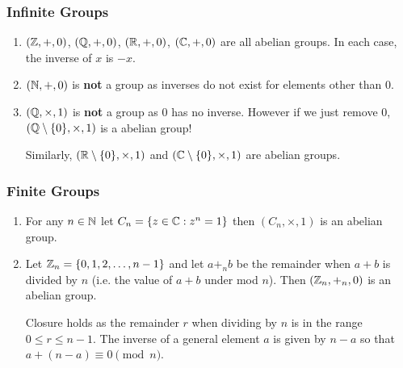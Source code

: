 \documentclass[../main.tex]{subfiles}
\begin{document}
\subsubsection{Infinite Groups}
\begin{enumerate}
  \item $(\mathbb{Z},  +, 0)$, $(\mathbb{Q}, +, 0)$, $(\mathbb{R}, +, 0)$, $(\mathbb{C}, +, 0)$ are all abelian groups.
    In each case, the inverse of $x$ is $-x$.
  \item $(\mathbb{N}, +, 0)$ is \textbf{not} a group as inverses do not exist for elements other than $0$.
  \item $(\mathbb{Q}, \times, 1)$ is \textbf{not} a group as $0$ has no inverse.
    However if we just remove 0, $(\mathbb{Q} \setminus \{0\}, \times, 1)$ is a abelian group!

    Similarly, $(\mathbb{R} \setminus \{0\}, \times, 1)$ and $(\mathbb{C} \setminus \{0\}, \times, 1)$ are abelian groups.
\end{enumerate}
\subsubsection{Finite Groups}
\begin{enumerate}
  \item For any $n \in \mathbb{N}$ let $C_n = \{z \in \mathbb{C} : z^{n} = 1\}$ then $(C_n, \times, 1)$ is an abelian group.
  \item Let $\mathbb{Z}_n = \{0, 1, 2, \ldots, n - 1\}$ and let $a +_n b$ be the remainder when $a + b$ is divided by $n$ (i.e. the value of $a + b$ under mod $n$).
    Then $(\mathbb{Z}_n, +_n, 0)$ is an abelian group.

    Closure holds as the remainder $r$ when dividing by $n$ is in the range $0 \leq r \leq n - 1$.
    The inverse of a general element $a$ is given by $n - a$ so that $a + (n - a) \equiv 0 \pmod{n}$.
\end{enumerate}
\end{document}
